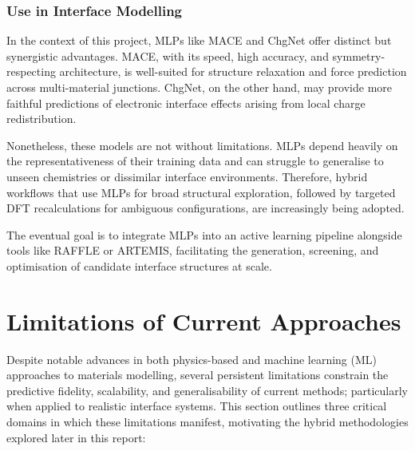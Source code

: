 \subsubsection{Use in Interface Modelling} 
 
In the context of this project, MLPs like MACE and ChgNet offer distinct but synergistic advantages. MACE, with its speed, high accuracy, and symmetry-respecting architecture, is well-suited for structure relaxation and force prediction across multi-material junctions. ChgNet, on the other hand, may provide more faithful predictions of electronic interface effects arising from local charge redistribution. 
 
Nonetheless, these models are not without limitations. MLPs depend heavily on the representativeness of their training data and can struggle to generalise to unseen chemistries or dissimilar interface environments. Therefore, hybrid workflows that use MLPs for broad structural exploration, followed by targeted DFT recalculations for ambiguous configurations, are increasingly being adopted. 
 
The eventual goal is to integrate MLPs into an active learning pipeline alongside tools like RAFFLE or ARTEMIS, facilitating the generation, screening, and optimisation of candidate interface structures at scale. 
 
\section{Limitations of Current Approaches} \label{section:limitations} 
 
Despite notable advances in both physics-based and machine learning (ML) approaches to materials modelling, several persistent limitations constrain the predictive fidelity, scalability, and generalisability of current methods; particularly when applied to realistic interface systems. This section outlines three critical domains in which these limitations manifest, motivating the hybrid methodologies explored later in this report: 
 
